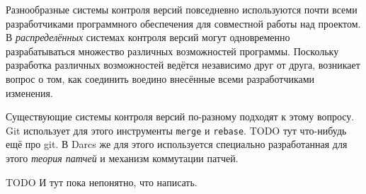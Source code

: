\startprefacepage

Разнообразные системы контроля версий повседневно используются почти
всеми разработчиками программного обеспечения для совместной работы
над проектом. В \emph{распределённых} системах контроля версий могут
одновременно разрабатываться множество различных возможностей
программы. Поскольку разработка различных возможностей ведётся
независимо друг от друга, возникает вопрос о том, как соединить
воедино внесённые всеми разработчиками изменения.

Существующие системы контроля версий по-разному подходят к этому
вопросу. Git использует для этого инструменты \texttt{merge} и
\texttt{rebase}. TODO тут что-нибудь ещё про git. В Darcs же для этого
используется специально разработанная для этого \emph{теория патчей} и
механизм коммутации патчей.

TODO И тут пока непонятно, что написать.